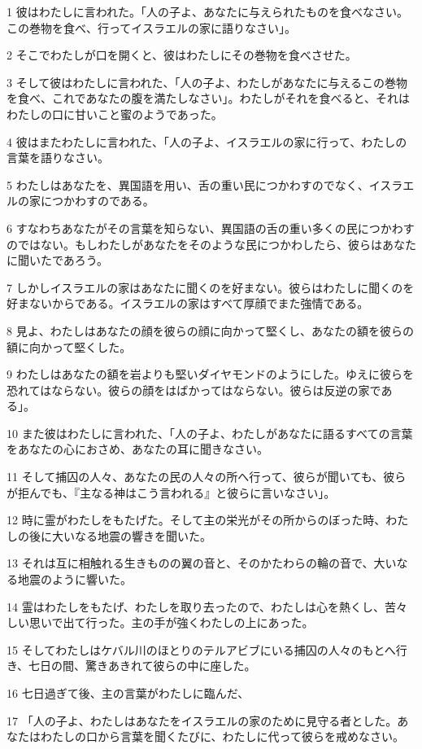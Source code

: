 \par 1 彼はわたしに言われた。「人の子よ、あなたに与えられたものを食べなさい。この巻物を食べ、行ってイスラエルの家に語りなさい」。
\par 2 そこでわたしが口を開くと、彼はわたしにその巻物を食べさせた。
\par 3 そして彼はわたしに言われた、「人の子よ、わたしがあなたに与えるこの巻物を食べ、これであなたの腹を満たしなさい」。わたしがそれを食べると、それはわたしの口に甘いこと蜜のようであった。
\par 4 彼はまたわたしに言われた、「人の子よ、イスラエルの家に行って、わたしの言葉を語りなさい。
\par 5 わたしはあなたを、異国語を用い、舌の重い民につかわすのでなく、イスラエルの家につかわすのである。
\par 6 すなわちあなたがその言葉を知らない、異国語の舌の重い多くの民につかわすのではない。もしわたしがあなたをそのような民につかわしたら、彼らはあなたに聞いたであろう。
\par 7 しかしイスラエルの家はあなたに聞くのを好まない。彼らはわたしに聞くのを好まないからである。イスラエルの家はすべて厚顔でまた強情である。
\par 8 見よ、わたしはあなたの顔を彼らの顔に向かって堅くし、あなたの額を彼らの額に向かって堅くした。
\par 9 わたしはあなたの額を岩よりも堅いダイヤモンドのようにした。ゆえに彼らを恐れてはならない。彼らの顔をはばかってはならない。彼らは反逆の家である」。
\par 10 また彼はわたしに言われた、「人の子よ、わたしがあなたに語るすべての言葉をあなたの心におさめ、あなたの耳に聞きなさい。
\par 11 そして捕囚の人々、あなたの民の人々の所へ行って、彼らが聞いても、彼らが拒んでも、『主なる神はこう言われる』と彼らに言いなさい」。
\par 12 時に霊がわたしをもたげた。そして主の栄光がその所からのぼった時、わたしの後に大いなる地震の響きを聞いた。
\par 13 それは互に相触れる生きものの翼の音と、そのかたわらの輪の音で、大いなる地震のように響いた。
\par 14 霊はわたしをもたげ、わたしを取り去ったので、わたしは心を熱くし、苦々しい思いで出て行った。主の手が強くわたしの上にあった。
\par 15 そしてわたしはケバル川のほとりのテルアビブにいる捕囚の人々のもとへ行き、七日の間、驚きあきれて彼らの中に座した。
\par 16 七日過ぎて後、主の言葉がわたしに臨んだ、
\par 17 「人の子よ、わたしはあなたをイスラエルの家のために見守る者とした。あなたはわたしの口から言葉を聞くたびに、わたしに代って彼らを戒めなさい。
